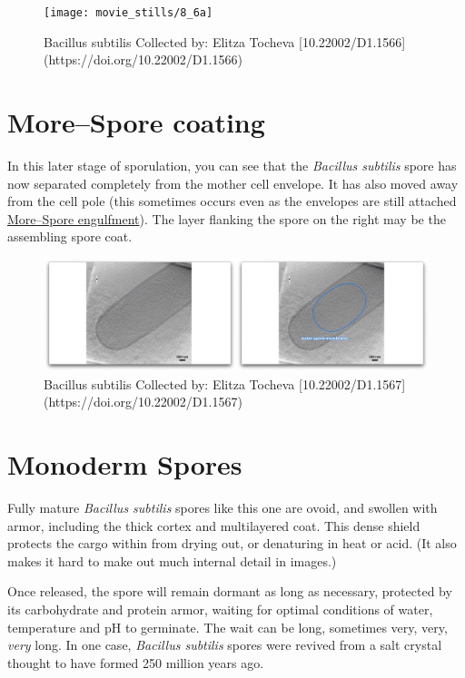 \documentclass[]{tufte-book}
\begin{document}
\begin{figure}
\texttt{[image: movie\_stills/8\_6a]} \caption[Bacillus subtilis Collected by]{Bacillus subtilis Collected by: Elitza Tocheva [10.22002/D1.1566](https://doi.org/10.22002/D1.1566)}\label{fig:unnamed-chunk-141}
\end{figure}

\hypertarget{morespore-coating}{\section{More--Spore
coating}\label{morespore-coating}}

In this later stage of sporulation, you can see that the \emph{Bacillus
subtilis} spore has now separated completely from the mother cell
envelope. It has also moved away from the cell pole (this sometimes
occurs even as the envelopes are still attached
\protect\hyperlink{morespore-engulfment}{More--Spore engulfment}). The
layer flanking the spore on the right may be the assembling spore coat.

\begin{figure}
\includegraphics{movie_stills/8_6b} \caption[Bacillus subtilis Collected by]{Bacillus subtilis Collected by: Elitza Tocheva [10.22002/D1.1567](https://doi.org/10.22002/D1.1567)}\label{fig:unnamed-chunk-142}
\end{figure}

\section{Monoderm Spores}\label{monoderm-spores}

Fully mature \emph{Bacillus subtilis} spores like this one are ovoid,
and swollen with armor, including the thick cortex and multilayered
coat. This dense shield protects the cargo within from drying out, or
denaturing in heat or acid. (It also makes it hard to make out much
internal detail in images.)

Once released, the spore will remain dormant as long as necessary,
protected by its carbohydrate and protein armor, waiting for optimal
conditions of water, temperature and pH to germinate. The wait can be
long, sometimes very, very, \emph{very} long. In one case,
\emph{Bacillus subtilis} spores were revived from a salt crystal thought
to have formed 250 million years ago.
\end{document}
